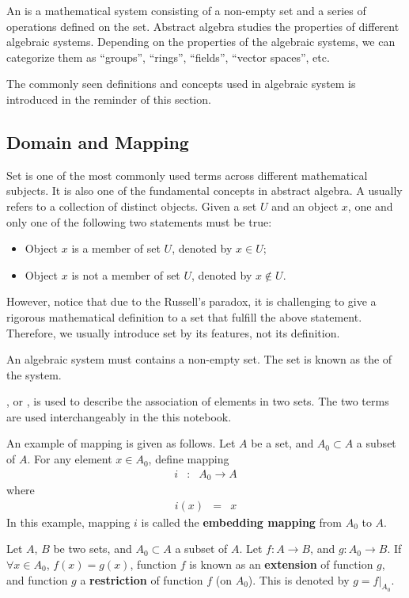 An  is a mathematical system consisting of a non-empty set and a series of operations defined on the set. Abstract algebra studies the properties of different algebraic systems. Depending on the properties of the algebraic systems, we can categorize them as ``groups'', ``rings'', ``fields'', ``vector spaces'', etc.

The commonly seen definitions and concepts used in algebraic system is introduced in the reminder of this section.

\subsection{Domain and Mapping}

Set is one of the most commonly used terms across different mathematical subjects. It is also one of the fundamental concepts in abstract algebra. A  usually refers to a collection of distinct objects. Given a set $U$ and an object $x$, one and only one of the following two statements must be true:
\begin{itemize}
  \item Object $x$ is a member of set $U$, denoted by $x \in U$;
  \item Object $x$ is not a member of set $U$, denoted by $x \notin U$.
\end{itemize}
However, notice that due to the Russell's paradox, it is challenging to give a rigorous mathematical definition to a set that fulfill the above statement. Therefore, we usually introduce set by its features, not its definition.

An algebraic system must contains a non-empty set. The set is known as the  of the system.

, or , is used to describe the association of elements in two sets. The two terms are used interchangeably in the this notebook. 

An example of mapping is given as follows. Let $A$ be a set, and $A_0 \subset A$ a subset of $A$. For any element $x\in A_0$, define mapping
\begin{eqnarray}
  i &:& A_0 \rightarrow A \nonumber
\end{eqnarray}
where
\begin{eqnarray}
  i(x) &=& x \nonumber
\end{eqnarray}
In this example, mapping $i$ is called the \textbf{embedding mapping} from $A_0$ to $A$.

Let $A$, $B$ be two sets, and $A_0 \subset A$ a subset of $A$. Let $f: A\rightarrow B$, and $g: A_0\rightarrow B$. If $\forall x\in A_0$, $f(x)=g(x)$, function $f$ is known as an \textbf{extension} of function $g$, and function $g$ a \textbf{restriction} of function $f$ (on $A_0$). This is denoted by $g=f|_{A_0}$.

